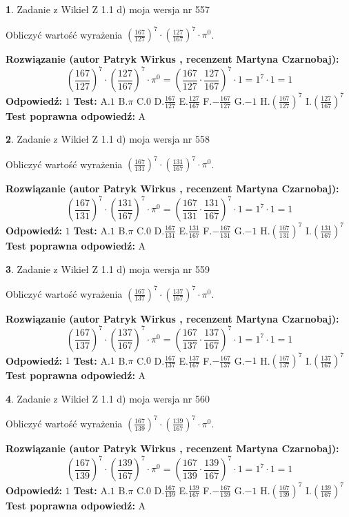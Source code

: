 \documentclass[12pt, a4paper]{article}
\theoremstyle{definition} %
\newtheorem{zad}{}
\newcommand{\zadStart}[1]{\begin{zad}#1\newline}
\newcommand{\zadStop}{\end{zad}}
\newcommand{\rozwStart}[2]{\noindent \textbf{Rozwiązanie (autor #1 , recenzent #2): }\newline}
\newcommand{\rozwStop}{\newline}
\newcommand{\odpStart}{\noindent \textbf{Odpowiedź:}\newline}
\newcommand{\odpStop}{\newline}
\newcommand{\testStart}{\noindent \textbf{Test:}\newline}
\newcommand{\testStop}{\newline}
\newcommand{\kluczStart}{\noindent \textbf{Test poprawna odpowiedź:}\newline}
\newcommand{\kluczStop}{\newline}
\begin{document}
\zadStart{Zadanie z Wikieł Z 1.1 d) moja wersja nr 557}

Obliczyć wartość wyrażenia $(\frac{167}{127})^{7} \cdot (\frac{127}{167})^{7} \cdot \pi^{0}$.
\zadStop
\rozwStart{Patryk Wirkus}{Martyna Czarnobaj}
$$(\frac{167}{127})^{7} \cdot (\frac{127}{167})^{7} \cdot \pi^{0} = (\frac{167}{127} \cdot \frac{127}{167})^{7} \cdot 1 = 1^{7} \cdot 1 = 1$$
\rozwStop
\odpStart
$1$
\odpStop
\testStart
A.$1$ B.$\pi$ C.$0$ D.$\frac{167}{127}$ E.$\frac{127}{167}$
F.$-\frac{167}{127}$ G.$-1$
H.$(\frac{167}{127})^{7}$
I.$(\frac{127}{167})^{7}$
\testStop
\kluczStart
A
\kluczStop



\zadStart{Zadanie z Wikieł Z 1.1 d) moja wersja nr 558}

Obliczyć wartość wyrażenia $(\frac{167}{131})^{7} \cdot (\frac{131}{167})^{7} \cdot \pi^{0}$.
\zadStop
\rozwStart{Patryk Wirkus}{Martyna Czarnobaj}
$$(\frac{167}{131})^{7} \cdot (\frac{131}{167})^{7} \cdot \pi^{0} = (\frac{167}{131} \cdot \frac{131}{167})^{7} \cdot 1 = 1^{7} \cdot 1 = 1$$
\rozwStop
\odpStart
$1$
\odpStop
\testStart
A.$1$ B.$\pi$ C.$0$ D.$\frac{167}{131}$ E.$\frac{131}{167}$
F.$-\frac{167}{131}$ G.$-1$
H.$(\frac{167}{131})^{7}$
I.$(\frac{131}{167})^{7}$
\testStop
\kluczStart
A
\kluczStop



\zadStart{Zadanie z Wikieł Z 1.1 d) moja wersja nr 559}

Obliczyć wartość wyrażenia $(\frac{167}{137})^{7} \cdot (\frac{137}{167})^{7} \cdot \pi^{0}$.
\zadStop
\rozwStart{Patryk Wirkus}{Martyna Czarnobaj}
$$(\frac{167}{137})^{7} \cdot (\frac{137}{167})^{7} \cdot \pi^{0} = (\frac{167}{137} \cdot \frac{137}{167})^{7} \cdot 1 = 1^{7} \cdot 1 = 1$$
\rozwStop
\odpStart
$1$
\odpStop
\testStart
A.$1$ B.$\pi$ C.$0$ D.$\frac{167}{137}$ E.$\frac{137}{167}$
F.$-\frac{167}{137}$ G.$-1$
H.$(\frac{167}{137})^{7}$
I.$(\frac{137}{167})^{7}$
\testStop
\kluczStart
A
\kluczStop



\zadStart{Zadanie z Wikieł Z 1.1 d) moja wersja nr 560}

Obliczyć wartość wyrażenia $(\frac{167}{139})^{7} \cdot (\frac{139}{167})^{7} \cdot \pi^{0}$.
\zadStop
\rozwStart{Patryk Wirkus}{Martyna Czarnobaj}
$$(\frac{167}{139})^{7} \cdot (\frac{139}{167})^{7} \cdot \pi^{0} = (\frac{167}{139} \cdot \frac{139}{167})^{7} \cdot 1 = 1^{7} \cdot 1 = 1$$
\rozwStop
\odpStart
$1$
\odpStop
\testStart
A.$1$ B.$\pi$ C.$0$ D.$\frac{167}{139}$ E.$\frac{139}{167}$
F.$-\frac{167}{139}$ G.$-1$
H.$(\frac{167}{139})^{7}$
I.$(\frac{139}{167})^{7}$
\testStop
\kluczStart
A
\kluczStop
\end{document}
